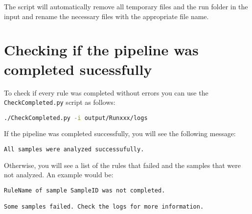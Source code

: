 The script will automatically remove all temporary files and the run folder in the input and rename the necessary files with the appropriate file name. 

\section{Checking if the pipeline was completed sucessfully}
To check if every rule was completed without errors you can use the \texttt{CheckCompleted.py} script as follows:
\begin{center}
    \lstinline[language=bash]{./CheckCompleted.py -i output/Runxxx/logs}
\end{center}

If the pipeline was completed successfully, you will see the following message:

\begin{lstlisting}
All samples were analyzed successufully.
\end{lstlisting}

Otherwise, you will see a list of the rules that failed and the samples that were not analyzed. An example would be:

\begin{lstlisting}
RuleName of sample SampleID was not completed.

Some samples failed. Check the logs for more information.
\end{lstlisting}
